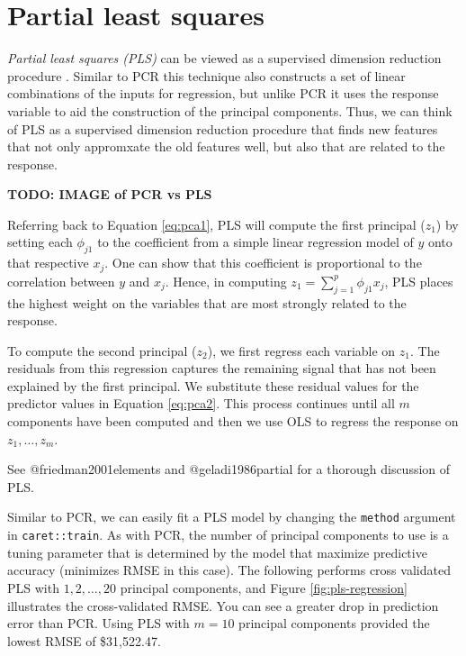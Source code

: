 \documentclass[]{book}
\theoremstyle{definition}
\theoremstyle{definition}
\theoremstyle{definition}
\theoremstyle{remark}
\begin{document}
\hypertarget{partial-least-squares}{%
\section{Partial least squares}\label{partial-least-squares}}

\emph{Partial least squares (PLS)} can be viewed as a supervised
dimension reduction procedure \citep{apm}. Similar to PCR this technique
also constructs a set of linear combinations of the inputs for
regression, but unlike PCR it uses the response variable to aid the
construction of the principal components. Thus, we can think of PLS as a
supervised dimension reduction procedure that finds new features that
not only appromxate the old features well, but also that are related to
the response.

\textbf{TODO: IMAGE of PCR vs PLS}

Referring back to Equation \eqref{eq:pca1}, PLS will compute the first
principal (\(z_1\)) by setting each \(\phi_{j1}\) to the coefficient
from a simple linear regression model of \(y\) onto that respective
\(x_j\). One can show that this coefficient is proportional to the
correlation between \(y\) and \(x_j\). Hence, in computing
\(z_1 = \sum^p_{j=1} \phi_{j1}x_j\), PLS places the highest weight on
the variables that are most strongly related to the response.

To compute the second principal (\(z_2\)), we first regress each
variable on \(z_1\). The residuals from this regression captures the
remaining signal that has not been explained by the first principal. We
substitute these residual values for the predictor values in Equation
\eqref{eq:pca2}. This process continues until all \(m\) components have
been computed and then we use OLS to regress the response on
\(z_1, \dots, z_m\).

\begin{note}
See @friedman2001elements and @geladi1986partial for a thorough
discussion of PLS.
\end{note}

Similar to PCR, we can easily fit a PLS model by changing the
\texttt{method} argument in \texttt{caret::train}. As with PCR, the
number of principal components to use is a tuning parameter that is
determined by the model that maximize predictive accuracy (minimizes
RMSE in this case). The following performs cross validated PLS with
\(1, 2, \dots, 20\) principal components, and Figure
\ref{fig:pls-regression} illustrates the cross-validated RMSE. You can
see a greater drop in prediction error than PCR. Using PLS with
\(m = 10\) principal components provided the lowest RMSE of \$31,522.47.
\end{document}
